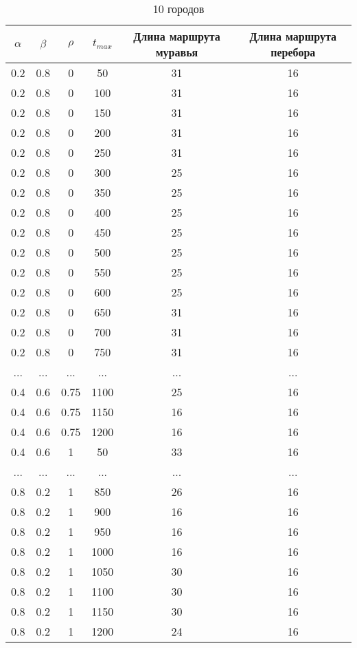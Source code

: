 \begin{table}[H]
    \centering
    \caption{10 городов}
    \label{table:city10}
    \begin{tabular}{|c|c|c|c|c|c|}
        \hline
        $\alpha$ & $\beta$ & $\rho$ & $t_{max}$ & Длина маршрута муравья & Длина маршрута перебора \\
        \hline
        0.2 & 0.8 & 0 & 50 & 31 & 16 \\
        0.2 & 0.8 & 0 & 100 & 31 & 16 \\
        0.2 & 0.8 & 0 & 150 & 31 & 16 \\
        0.2 & 0.8 & 0 & 200 & 31 & 16 \\
        0.2 & 0.8 & 0 & 250 & 31 & 16 \\
        0.2 & 0.8 & 0 & 300 & 25 & 16 \\
        0.2 & 0.8 & 0 & 350 & 25 & 16 \\
        0.2 & 0.8 & 0 & 400 & 25 & 16 \\
        0.2 & 0.8 & 0 & 450 & 25 & 16 \\
        0.2 & 0.8 & 0 & 500 & 25 & 16 \\
        0.2 & 0.8 & 0 & 550 & 25 & 16 \\
        0.2 & 0.8 & 0 & 600 & 25 & 16 \\
        0.2 & 0.8 & 0 & 650 & 31 & 16 \\
        0.2 & 0.8 & 0 & 700 & 31 & 16 \\
        0.2 & 0.8 & 0 & 750 & 31 & 16 \\
        ... & ... & ... & ... & ... & ... \\
        0.4 & 0.6 & 0.75 & 1100 & 25 & 16 \\
        0.4 & 0.6 & 0.75 & 1150 & 16 & 16 \\
        0.4 & 0.6 & 0.75 & 1200 & 16 & 16 \\
        0.4 & 0.6 & 1 & 50 & 33 & 16 \\
        ... & ... & ... & ... & ... & ...\\
        0.8 & 0.2 & 1 & 850 & 26 & 16 \\
        0.8 & 0.2 & 1 & 900 & 16 & 16 \\
        0.8 & 0.2 & 1 & 950 & 16 & 16 \\
        0.8 & 0.2 & 1 & 1000 & 16 & 16 \\
        0.8 & 0.2 & 1 & 1050 & 30 & 16 \\
        0.8 & 0.2 & 1 & 1100 & 30 & 16 \\
        0.8 & 0.2 & 1 & 1150 & 30 & 16 \\
        0.8 & 0.2 & 1 & 1200 & 24 & 16 \\
        \hline
    \end{tabular}
\end{table}

